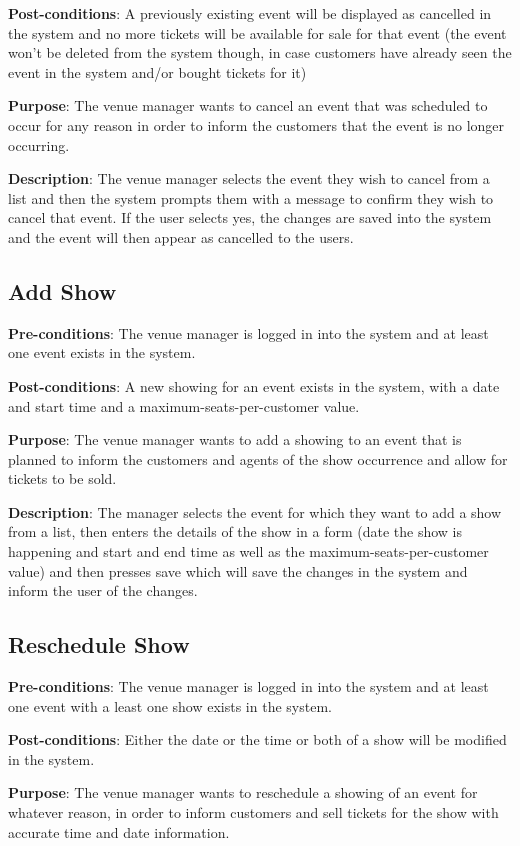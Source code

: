 \textbf{Post-conditions}: A previously existing event will be displayed
as cancelled in the system and no more tickets will be available for sale
for that event (the event won't be deleted from the system though, in case
customers have already seen the event in the system and/or bought tickets
for it)

\textbf{Purpose}: The venue manager wants to cancel an event that was
scheduled to occur for any reason in order to inform the customers
that the event is no longer occurring.

\textbf{Description}: The venue manager selects the event they wish to
cancel from a list and then the system prompts them with a message
to confirm they wish to cancel that event. If the user selects yes, the
changes are saved into the system and the event will then appear as
cancelled to the users.

\subsection{Add Show}
\textbf{Pre-conditions}: The venue manager is logged in into the system
and at least one event exists in the system.

\textbf{Post-conditions}: A new showing for an event exists in the system,
with a date and start time and a maximum-seats-per-customer value.

\textbf{Purpose}: The venue manager wants to add a showing to an event
that is planned to inform the customers and agents of the show occurrence
and allow for tickets to be sold.

\textbf{Description}: The manager selects the event for which they
want to add a show from a list, then enters the details of the show
in a form (date the show is happening and start and end time as well
as the maximum-seats-per-customer value) and then presses save which
will save the changes in the system and inform the user of the changes.

\subsection{Reschedule Show}
\textbf{Pre-conditions}: The venue manager is logged in into the system
and at least one event with a least one show exists in the system.

\textbf{Post-conditions}: Either the date or the time or both of a show
will be modified in the system.

\textbf{Purpose}: The venue manager wants to reschedule a showing of
an event for whatever reason, in order to inform customers and sell
tickets for the show with accurate time and date information.

